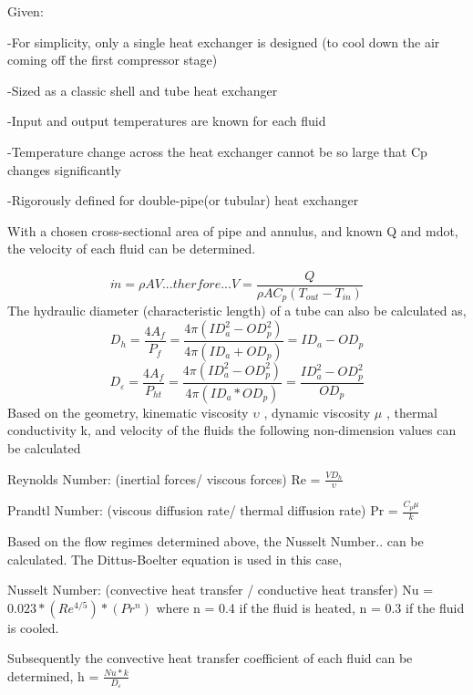 \documentclass[heading.tex]{subfiles}
\begin{document}
Given:

-For simplicity, only a single heat exchanger is designed (to cool down the air coming off the first compressor stage)

-Sized as a classic shell and tube heat exchanger

-Input and output temperatures are known for each fluid

-Temperature change across the heat exchanger cannot be so large that Cp changes significantly

-Rigorously defined for double-pipe(or tubular) heat exchanger

With a chosen cross-sectional area of pipe and annulus, and known Q and mdot, the velocity of each fluid can be determined.

\begin{equation*}
\dot{m} = \rho A V     ...therfore...        V  = \frac{Q} {\rho A C_{p} (T_{out} - T_{in})}
\end{equation*}
The hydraulic diameter (characteristic length) of a tube can also be calculated as,
\begin{equation*}
D_{h} = \frac{4 A_{f}} {P_{f}}  = \frac{4 \pi (ID_{a}^2-OD_{p}^2)} {4 \pi (ID_{a}+OD_{p})} = ID_{a}-OD_{p}
\end{equation*}
\begin{equation*}
D_{\varepsilon} = \frac{4 A_{f}} {P_{ht}}   =  \frac{4 \pi (ID_{a}^2-OD_{p}^2)} {4 \pi (ID_{a}*OD_{p})} = \frac{ID_{a}^2-OD_{p}^2}{OD_{p}}
\end{equation*}
Based on the geometry, kinematic viscosity  $\upsilon$ , dynamic viscosity  $\mu$ , thermal conductivity k, and velocity of the fluids the
following non-dimension values can be calculated

Reynolds Number: (inertial forces/ viscous forces)  Re = $\frac{V D_{h}} {\upsilon}$

Prandtl Number: (viscous diffusion rate/ thermal diffusion rate)  Pr = $\frac{C_{p} \mu} {k}$

Based on the flow regimes determined above, the Nusselt Number.. can be calculated. The Dittus-Boelter equation is used in this case,

Nusselt Number: (convective heat transfer / conductive heat transfer)  Nu = $0.023*(Re^{4/5})*(Pr^{n})$ where n = 0.4 if the fluid is heated, n = 0.3 if the fluid is cooled.

Subsequently the convective heat transfer coefficient of each fluid can be determined,  h = $\frac{Nu*k} {D_{\varepsilon}}$
\end{document}

